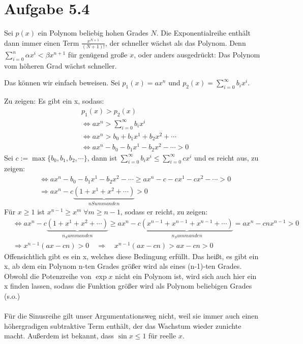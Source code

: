 \documentclass[a4paper,german,12pt,smallheadings]{scrartcl}
\begin{document}
\section*{Aufgabe 5.4}

Sei $p(x)$ ein Polynom beliebig hohen Grades $N$. Die Exponentialreihe enthält
dann immer einen Term $\frac{x^{N+1}}{(N+1)!}$, der schneller wächst als das
Polynom. Denn $\sum_{i=0}^n \alpha x^i < \beta x^{n+1}$ für genügend große $x$,
oder anders ausgedrückt: Das Polynom vom höheren Grad wächst schneller.

Das können wir einfach beweisen. Sei $p_1(x)=ax^n$ und $p_2(x)=\sum\limits_{i=0}^{\infty} b_i x^i$.

Zu zeigen: Es gibt ein x, sodass:
\begin{align*}
  &p_1(x)>p_2(x)\\
  & \Leftrightarrow ax^n>\sum\limits_{i=0}^{\infty} b_i x^i\\
  & \Leftrightarrow ax^n>b_0+b_1x^1+b_2x^2+ \cdots\\
  & \Leftrightarrow ax^n-b_0-b_1x^1-b_2x^2- \cdots >0
\end{align*}
Sei $c:=\max\{b_0,b_1,b_2,\cdots\}$, dann ist $\sum\limits_{i=0}^{\infty} b_i x^i \leq \sum\limits_{i=0}^{\infty} c x^i$ und es reicht aus, zu zeigen:
\begin{align*}
  & \Leftrightarrow ax^n-b_0-b_1x^1-b_2x^2- \cdots \geq ax^n-c-cx^1-cx^2- \cdots>0\\
  & \Rightarrow ax^n-c\underbrace{\left(1+x^1+x^2+\cdots \right)}_{n Summanden}>0
\end{align*}
Für $x \geq 1$ ist $x^{n-1} \geq x^m \; \forall m \geq n-1$, sodass er reicht, zu zeigen:
\begin{align*}
  & \Leftrightarrow ax^n-c\underbrace{\left(1+x^1+x^2+\cdots \right)}_{n_Summanden} \geq ax^n-c\underbrace{\left(x^{n-1}+x^{n-1}+x^{n-1}+\cdots \right)}_{n_Summanden} = ax^n-cnx^{n-1} > 0\\
  & \Rightarrow x^{n-1}\left(ax-cn\right)>0 \quad \Rightarrow \quad x^{n-1}\left(ax-cn\right)>ax-cn>0
\end{align*}
Offensichtlich gibt es ein x, welches diese Bedingung erfüllt. Das heißt, es gibt ein x, ab dem ein Polynom n-ten Grades größer wird als eines (n-1)-ten Grades.\\
Obwohl die Potenzreihe von $\exp x$ nicht ein Polynom ist, wird sich auch hier ein x finden lassen, sodass die Funktion größer wird als Polynom beliebigen Grades (s.o.) \\
\\
Für die Sinusreihe gilt unser Argumentationsweg nicht, weil sie immer auch einen
höhergradigen subtraktive Term enthält, der das Wachstum wieder zunichte macht.
Außerdem ist bekannt, dass $\sin x \le 1$ für reelle $x$.
\end{document}

